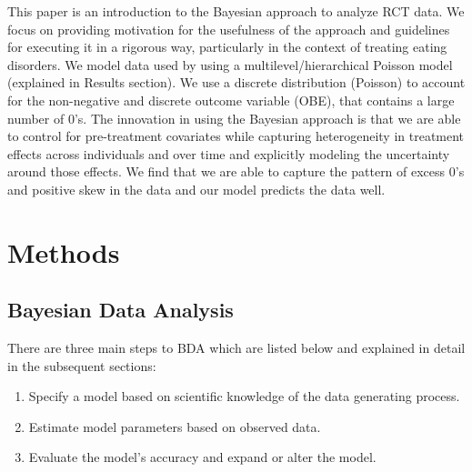 \documentclass{article}
\begin{document}
This paper is an introduction to the Bayesian approach to analyze RCT data. We focus on providing motivation for the usefulness of the approach and guidelines for executing it in a rigorous way, particularly in the context of treating eating disorders. We model data used by  using a multilevel/hierarchical Poisson model (explained in Results section). We use a discrete distribution (Poisson) to account for the non-negative and discrete outcome variable (OBE), that contains a large number of 0's. The innovation in using the Bayesian approach is that we are able to control for pre-treatment covariates while capturing heterogeneity in treatment effects across individuals and over time and explicitly modeling the uncertainty around those effects.  We find that we are able to capture the pattern of excess 0's and positive skew in the data and our model predicts the data well. \\

\section*{Methods}
\subsection*{Bayesian Data Analysis}
There are three main steps to BDA which are listed below and explained in detail in the subsequent sections:
\begin{enumerate}
\item Specify a model based on scientific knowledge of the data generating process.
\item Estimate model parameters based on observed data.
\item Evaluate the model's accuracy and expand or alter the model.
\end{enumerate}
\end{document}
